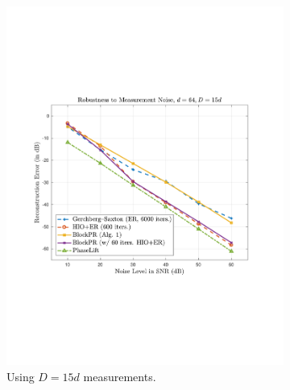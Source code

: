\begin{figure}[hbtp]
\begin{subfigure}[b]{0.495\textwidth}
\includegraphics[clip=true, trim = 0.75in 2.75in 1in 2.5in,scale=0.45]{pics/robustness_600b}
\caption{Using $D=15d$ measurements.}
\label{fig:noise-15d}
\end{subfigure}\vspace{0.1in} \\
\begin{subfigure}[b]{0.495\textwidth}
\centering

\end{subfigure}
\end{figure}
